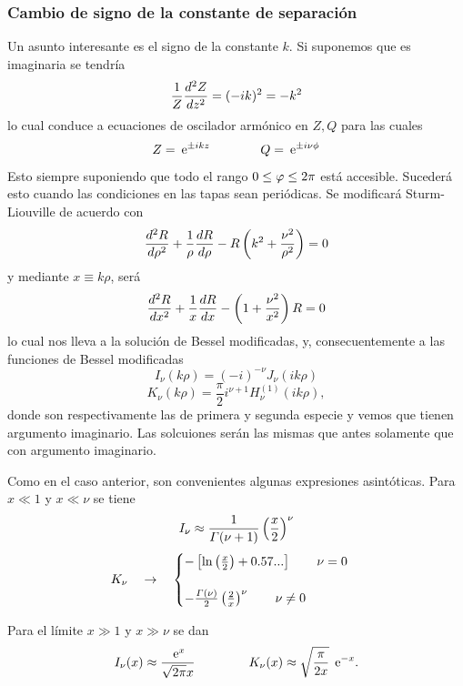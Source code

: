 \documentclass[10pt,oneside]{CBFT_book}
\begin{document}
\subsubsection{Cambio de signo de la constante de separación}

Un asunto interesante es el signo de la constante $k$. Si suponemos que es imaginaria se
tendría
\[
	\frac{1}{Z} \dtot[2]{Z}{z} = (-ik)^2 = -k^2
\]
lo cual conduce a ecuaciones de oscilador armónico en $Z, Q$ para las cuales
\[
	Z = \euler^{\pm i k z} \qquad \qquad Q = \euler^{\pm i \nu \phi}
\]
Esto siempre suponiendo que todo el rango $0 \leq \vp \leq 2\pi$ está accesible.
Sucederá esto cuando las condiciones en las tapas sean periódicas.
Se modificará Sturm-Liouville de acuerdo con
\[
	\dtot[2]{R}{\rho} + \frac{1}{\rho} \dtot{R}{\rho} - R \left( k^2 + \frac{\nu^2}{\rho^2}\right) = 0 
\]
y mediante $x \equiv k\rho$, será
\[
	\dtot[2]{R}{x} + \frac{1}{x} \dtot{R}{x} - \left( 1 + \frac{\nu^2}{x^2}\right) R = 0 
\]
lo cual nos lleva a la solución de Bessel modificadas, y, consecuentemente 
a las funciones de Bessel modificadas
\[
	I_\nu(k\rho) = (-i)^{-\nu} J_\nu(ik\rho)
\]
\[
	K_\nu(k\rho) = \frac{\pi}{2}i^{\nu+1} H_\nu^{(1)}(ik\rho),
\]
donde son respectivamente las de primera y segunda especie y vemos que tienen 
argumento imaginario.
Las solcuiones serán las mismas que antes solamente que con argumento 
imaginario.



Como en el caso anterior, son convenientes algunas expresiones asintóticas.
Para $ x \ll 1$ y $ x \ll \nu $ se tiene
\[
	I_\nu \approx \frac{1}{\Gamma(\nu+1)} \Frac{x}{2}^\nu 
\]
\[
	K_\nu \quad \to \quad \begin{cases}
			- \left[ \ln\Frac{x}{2} + 0.57... \right] \qquad \nu=0 \\
			\\
			- \frac{\Gamma(\nu)}{2}\Frac{2}{x}^\nu \qquad \nu \neq 0
	             \end{cases}
\]

Para el límite $ x \gg 1 $ y $ x \gg \nu$ se dan
\[
	I_\nu(x) \approx \frac{\euler^{x}}{\sqrt{ 2 \pi } x} \: \qquad \qquad 
	K_\nu(x) \approx \sqrt{ \frac{\pi}{2 x} } \: \euler^{-x}.
\]
\end{document}
